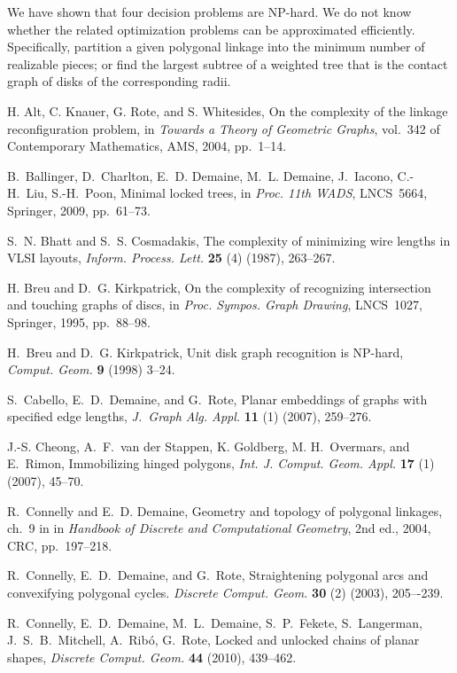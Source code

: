 \documentclass{llncs}
\begin{document}
We have shown that four decision problems are NP-hard. We do not know whether the related optimization problems can be approximated efficiently. Specifically, partition a given polygonal linkage into the minimum number of realizable pieces; or find the largest subtree of a weighted tree that is the contact graph of disks of the corresponding radii.


\begin{thebibliography}{99}
\itemsep -1pt

H. Alt, C. Knauer, G. Rote, and S. Whitesides,
On the complexity of the linkage reconfiguration problem,
in \emph{Towards a Theory of Geometric Graphs},
vol.~342 of Contemporary Mathematics, AMS, 2004, pp.~1--14.

B.~Ballinger, D.~Charlton, E.~D. Demaine, M.~L. Demaine,
J.~Iacono, C.-H.~Liu, S.-H.~Poon,
Minimal locked trees,
in \emph{Proc. 11th WADS}, LNCS~5664, Springer, 2009, pp.~61--73.

S.~N. Bhatt and S.~S. Cosmadakis,
The complexity of minimizing wire lengths in VLSI layouts,
\emph{Inform. Process. Lett.} {\bf 25} (4) (1987), 263--267.

H. Breu and D.~G. Kirkpatrick,
On the complexity of recognizing intersection and touching graphs of discs,
in \emph{Proc. Sympos. Graph Drawing}, LNCS~1027, Springer,  1995, pp.~88--98.

H.~Breu and D.~G. Kirkpatrick,
Unit disk graph recognition is NP-hard,
\emph{Comput. Geom.} {\bf 9} (1998) 3--24.

S.~Cabello, E.~D.~Demaine, and G.~Rote,
Planar embeddings of graphs with specified edge lengths,
\emph{J.~Graph Alg. Appl.} {\bf 11} (1) (2007), 259--276.

J.-S. Cheong, A.~F.~van der Stappen, K. Goldberg, M. H.~Overmars, and E.~Rimon,
Immobilizing hinged polygons,
\emph{Int. J. Comput. Geom. Appl.} {\bf 17} (1) (2007), 45--70.

R.~Connelly and E.~D. Demaine,
Geometry and topology of polygonal linkages, ch.~9 in
in \emph{Handbook of Discrete and Computational Geometry}, 2nd ed., 2004, CRC, pp.~197--218.

R.~Connelly, E.~D.~Demaine, and G.~Rote,
Straightening polygonal arcs and convexifying polygonal cycles.
\emph{Discrete Comput. Geom.} {\bf 30} (2) (2003), 205–-239.

R.~Connelly, E.~D.~Demaine, M.~L.~Demaine, S.~P.~Fekete, S.~Langerman,
J.~S.~B.~Mitchell, A.~Rib\'o, G.~Rote,
Locked and unlocked chains of planar shapes,
\emph{Discrete Comput. Geom.} {\bf 44} %
(2010), 439--462.


\end{thebibliography}
\end{document}
